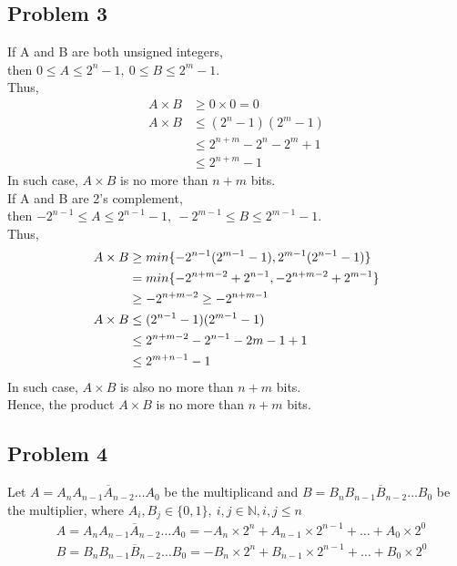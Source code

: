 \documentclass{article}
\begin{document}
\subsection*{Problem 3}
If A and B are both unsigned integers, \\
then $ 0 \le A \le 2^n - 1,\ 0 \le B \le 2^m - 1$. \\
Thus,
\begin{align*}
    A \times B & \ge 0 \times 0 = 0                \\
    A \times B & \le (2^n - 1)(2^m - 1)            \\
               & \le 2^{n + m} - 2^{n} - 2^{m} + 1 \\
               & \le 2^{n+m} - 1
\end{align*}
In such case, $A \times B$ is no more than $n + m$ bits.
\\
If A and B are 2's complement, \\
then $ -2^{n-1} \le A \le 2^{n-1} - 1,\ -2^{m-1} \le B \le 2^{m-1} - 1$. \\
Thus,
\begin{align*}
    A \times B & \ge min\{ -2^{n-1}(2^{m-1} - 1), \-2^{m-1}(2^{n-1} - 1) \} \\
               & = min\{ -2^{n+m-2} + 2^{n-1}, -2^{n+m-2} + 2^{m-1}\}       \\
               & \ge -2^{n+m-2} \ge -2^{n+m-1}                              \\
    A \times B & \le (2^{n-1} - 1)(2^{m-1} - 1)                             \\
               & \le 2^{n+m-2} - 2^{n-1} - 2{m-1} + 1                       \\
               & \le 2^{m+n-1} - 1
\end{align*}
In such case, $A \times B$ is also no more than $n + m$ bits. \\
Hence, the product $ A \times B $ is no more than $n + m$ bits.


\newpage
\subsection*{Problem 4}
Let $A = \overline{A_{n} A_{n-1} A_{n-2} \dots A_{0}}$ be the multiplicand and $B = \overline{B_{n} B_{n-1} B_{n-2} \dots B_{0}}$ be the multiplier, where $A_i, B_j\in \{0, 1\},\ i,j \in \mathbb{N}, i,j \le n$
\begin{align*}
     & A = \overline{A_{n} A_{n-1} A_{n-2} \dots A_{0}} = - A_{n} \times 2^{n} + A_{n-1} \times 2^{n-1} + \dots + A_{0} \times 2^{0} \\
     & B = \overline{B_{n} B_{n-1} B_{n-2} \dots B_{0}} = - B_{n} \times 2^{n} + B_{n-1} \times 2^{n-1} + \dots + B_{0} \times 2^{0}
\end{align*}
\end{document}
